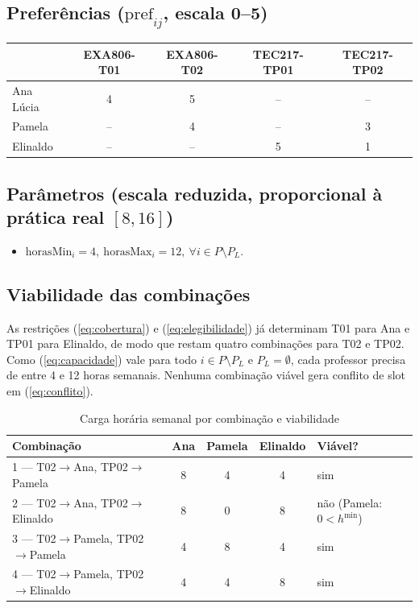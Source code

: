 \documentclass[11pt,a4paper]{article}
\begin{document}
\subsection{Preferências ($\mathrm{pref}_{ij}$, escala 0--5)}
\begin{center}
\begin{tabular}{lcccc}
\toprule
 & EXA806-T01 & EXA806-T02 & TEC217-TP01 & TEC217-TP02 \\
\midrule
Ana Lúcia & 4 & 5 & -- & -- \\
Pamela    & -- & 4 & -- & 3 \\
Elinaldo  & -- & -- & 5 & 1 \\
\bottomrule
\end{tabular}
\end{center}

\subsection{Parâmetros (escala reduzida, proporcional à prática real $[8,16]$)}
\begin{itemize}
    \item $\mathrm{horasMin}_{i}=4,\ \mathrm{horasMax}_{i}=12,\ \forall i\in P\setminus P_L$.
\end{itemize}

\subsection{Viabilidade das combinações}

As restrições (\ref{eq:cobertura}) e (\ref{eq:elegibilidade}) já determinam T01 para Ana e TP01 para Elinaldo, de modo que restam quatro combinações para T02 e TP02. Como (\ref{eq:capacidade}) vale para todo $i\in P\setminus P_L$ e $P_L=\emptyset$, cada professor precisa de entre 4 e 12 horas semanais. Nenhuma combinação viável gera conflito de slot em (\ref{eq:conflito}).

\begin{table}[htbp]
\centering
\caption{Carga horária semanal por combinação e viabilidade}
\label{tab:viabilidade}
\small
\begin{tabular}{lcccl}
\toprule
Combinação & Ana & Pamela & Elinaldo & Viável? \\
\midrule
1 --- T02$\to$Ana, TP02$\to$Pamela      & 8 & 4 & 4 & sim \\
2 --- T02$\to$Ana, TP02$\to$Elinaldo    & 8 & 0 & 8 & não (Pamela: $0<h^{\min}$) \\
3 --- T02$\to$Pamela, TP02$\to$Pamela   & 4 & 8 & 4 & sim \\
4 --- T02$\to$Pamela, TP02$\to$Elinaldo & 4 & 4 & 8 & sim \\
\bottomrule
\end{tabular}
\end{table}
\end{document}
